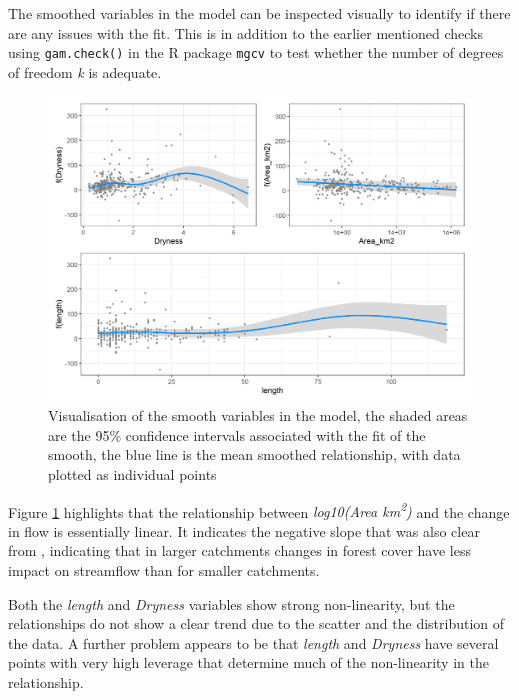 \documentclass[]{elsarticle} %
\begin{document}
The smoothed variables in the model can be inspected visually to identify if there are any issues with the fit. This is in addition to the earlier mentioned checks using \texttt{gam.check()} in the R package \texttt{mgcv} to test whether the number of degrees of freedom \emph{k} is adequate.

\begin{figure}
\includegraphics[width=0.9\linewidth]{Forest_model_allsmooths} \caption{Visualisation of the smooth variables in the model, the shaded areas are the 95\% confidence intervals associated with the fit of the smooth, the blue line is the mean smoothed relationship, with data plotted as individual points}\label{fig:smoothsmodelall}
\end{figure}

Figure \ref{fig:smoothsmodelall} highlights that the relationship between \emph{log10(Area km\textsuperscript{2})} and the change in flow is essentially linear. It indicates the negative slope that was also clear from \citet{zhang2017}, indicating that in larger catchments changes in forest cover have less impact on streamflow than for smaller catchments.

Both the \emph{length} and \emph{Dryness} variables show strong non-linearity, but the relationships do not show a clear trend due to the scatter and the distribution of the data. A further problem appears to be that \emph{length} and \emph{Dryness} have several points with very high leverage that determine much of the non-linearity in the relationship.
\end{document}
